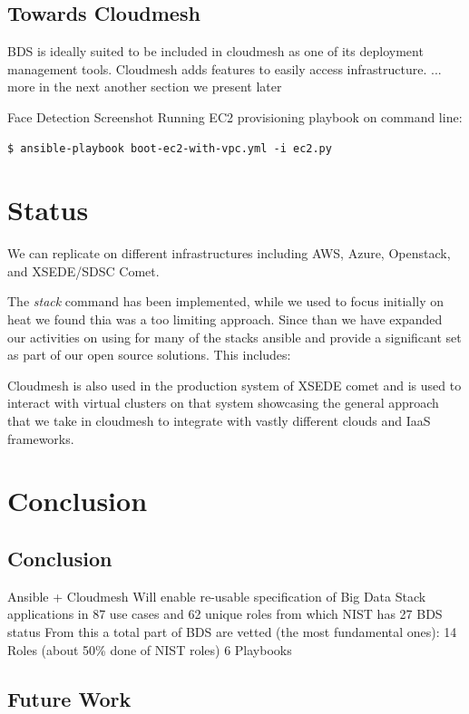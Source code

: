 \subsection{Towards Cloudmesh}

BDS is ideally suited to be included in cloudmesh as one of its
deployment management tools. Cloudmesh adds features to easily access
infrastructure. ... more in the next another section we present later

Face Detection Screenshot Running EC2 provisioning playbook
on command line:

\begin{Verbatim}
$ ansible-playbook boot-ec2-with-vpc.yml -i ec2.py
\end{Verbatim} 







\section{Status}


We can replicate on different infrastructures including AWS, Azure,
Openstack, and XSEDE/SDSC Comet.

The {\it stack} command has been implemented, while we used to focus initially
on heat we found thia was a too limiting approach. Since than we have
expanded our activities on using for many of the stacks ansible and
provide a significant set as part of our open source solutions. This
includes:


Cloudmesh is also used in the production system of XSEDE comet and is
used to interact with virtual clusters on that system showcasing the
general approach that we take in cloudmesh to integrate with vastly
different clouds and IaaS frameworks.

\section{Conclusion}\label{S:conclusion}


\subsection{Conclusion}
Ansible + Cloudmesh
Will enable re-usable specification of Big Data Stack applications in 87 use cases and 62 unique roles from which NIST has 27
BDS status
From this a total part of BDS are vetted (the most fundamental ones): 
14 Roles  (about 50\% done of NIST roles)
6   Playbooks



\subsection{Future Work}



